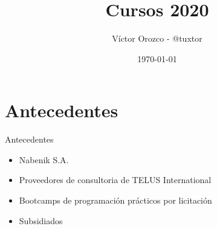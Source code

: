 \documentclass[aspectratio=169]{beamer}
\title{Cursos 2020}
\author{Víctor Orozco - @tuxtor}
\institute{Academik}
\date{\today}
\begin{document}
{
    \frame{\titlepage}
}


{
	\section{Antecedentes}
}

\begin{frame}[fragile]{Antecedentes}
	\begin{itemize}
		\item Nabenik S.A.
		\item Proveedores de consultoria de TELUS International
		\item Bootcamps de programación prácticos por licitación
		\item Subsidiados
	\end{itemize}	
\end{frame}
\end{document}
